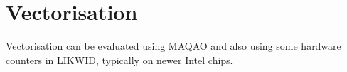 \section{Vectorisation}
\label{section:core:vectorisation}

\begin{wip}
Vectorisation can be evaluated using MAQAO and also using some hardware counters in LIKWID, typically on newer Intel chips.
\end{wip}

